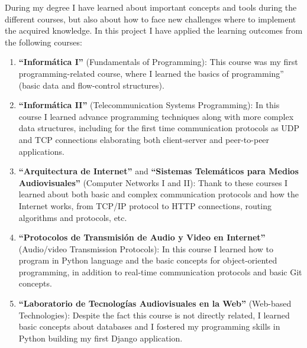 \documentclass[a4paper, 12pt]{book}
\begin{document}
During my degree I have learned about important concepts and tools during the different courses,
but also about how to face new challenges where to implement the acquired knowledge.
In this project I have applied the learning outcomes from the following courses:
\begin{enumerate}
  \item \textbf{``Informática I''} (Fundamentals of Programming): This course was my first programming-related course,
  where I learned the basics of programming'' (basic data and flow-control structures).
  \item \textbf{``Informática II''} (Telecommunication Systems Programming): In this course I learned advance programming
  techniques along with more complex data structures, including for the first time communication protocols as UDP and TCP connections
  elaborating both client-server and peer-to-peer applications.
  \item \textbf{``Arquitectura de Internet''} and \textbf{``Sistemas Telemáticos para Medios Audiovisuales''} (Computer Networks I and II):
  Thank to these courses I learned about both basic and complex communication protocols and how the Internet works,
  from TCP/IP protocol to HTTP connections, routing algorithms and protocols, etc.
  \item \textbf{``Protocolos de Transmisión de Audio y Video en Internet''} (Audio/video Transmission Protocols):
  In this course I learned how to program in Python language and the basic concepts for object-oriented programming, in
  addition to real-time communication protocols and basic Git concepts.
  \item \textbf{``Laboratorio de Tecnologías Audiovisuales en la Web''} (Web-based Technologies): Despite the fact this course
  is not directly related, I learned basic concepts about databases and I fostered my programming skills in Python building
  my first Django application.
\end{enumerate}
\end{document}
